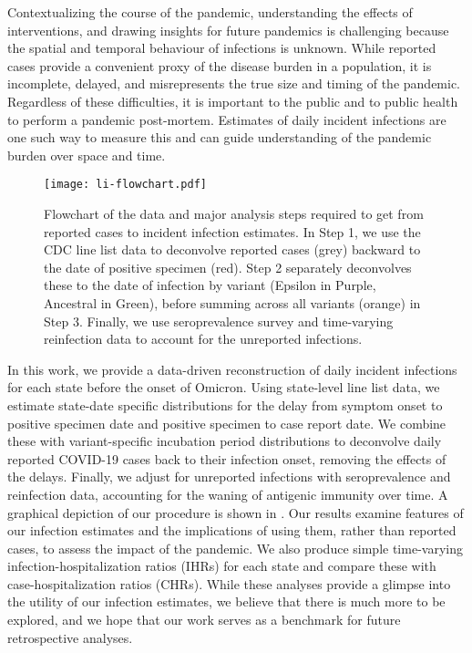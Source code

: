 Contextualizing the course of the pandemic, understanding the effects of
interventions, and drawing insights for future pandemics is challenging because
the spatial and temporal behaviour of infections is unknown. While reported
cases provide a convenient proxy of the disease burden in a population, it is
incomplete, delayed, and misrepresents the true size and timing of the pandemic.
Regardless of these difficulties, it is important to the public and to public
health to perform a pandemic post-mortem. Estimates of daily incident infections
are one such way to measure this and can guide understanding of the pandemic
burden over space and time. 

\begin{figure}[H]
\centering
    \texttt{[image: li-flowchart.pdf]} 
    \caption{Flowchart of the data and major analysis steps required to get from
    reported cases to incident infection estimates. In Step 1, we use the CDC
    line list data to deconvolve reported cases (grey) backward to the date of
    positive specimen (red). Step 2 separately deconvolves these to the date of
    infection by variant (Epsilon in Purple, Ancestral in Green), 
    before summing across all variants (orange)
    in Step 3. Finally, we use seroprevalence
    survey and time-varying reinfection data to account for the unreported
    infections.}
    \label{fig:cases_to_infect_flowchart}
\end{figure}
    

In this work, we provide a data-driven reconstruction of daily incident
infections for each \US state before the onset of Omicron. Using
state-level line list data, we estimate state-date specific distributions for
the delay from symptom onset to positive specimen date and positive specimen to
case report date. We combine these with variant-specific incubation period
distributions to deconvolve daily reported COVID-19 cases back to their
infection onset, removing the effects of the delays. Finally, we adjust for
unreported infections with seroprevalence and reinfection data, accounting for
the waning of antigenic immunity over time. A graphical depiction of our
procedure is shown in . Our results examine
features of our infection estimates and the implications of using them, rather
than reported cases, to assess the impact of the pandemic. We also produce
simple time-varying infection-hospitalization ratios (IHRs) for each state and
compare these with case-hospitalization ratios (CHRs). While these analyses
provide a glimpse into the utility of our infection estimates, we believe that
there is much more to be explored, and we hope that our work serves as a
benchmark for future retrospective analyses. 

